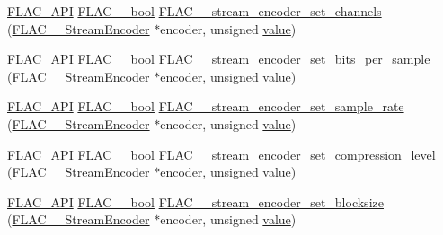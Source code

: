 \begin{DoxyCompactItemize}
\item 
\mbox{\hyperlink{group__flac__export_ga56ca07df8a23310707732b1c0007d6f5}{F\+L\+A\+C\+\_\+\+A\+PI}} \mbox{\hyperlink{ordinals_8h_a95103469f1cbd78b8cf250194985b34e}{F\+L\+A\+C\+\_\+\+\_\+bool}} \mbox{\hyperlink{group__flac__stream__encoder_gabfc9c883c124a849b5b42a87c30e10a5}{F\+L\+A\+C\+\_\+\+\_\+stream\+\_\+encoder\+\_\+set\+\_\+channels}} (\mbox{\hyperlink{struct_f_l_a_c_____stream_encoder}{F\+L\+A\+C\+\_\+\+\_\+\+Stream\+Encoder}} $\ast$encoder, unsigned \mbox{\hyperlink{_s_d_l__opengl__glext_8h_a8ad81492d410ff2ac11f754f4042150f}{value}})
\item 
\mbox{\hyperlink{group__flac__export_ga56ca07df8a23310707732b1c0007d6f5}{F\+L\+A\+C\+\_\+\+A\+PI}} \mbox{\hyperlink{ordinals_8h_a95103469f1cbd78b8cf250194985b34e}{F\+L\+A\+C\+\_\+\+\_\+bool}} \mbox{\hyperlink{group__flac__stream__encoder_ga5a21cf7f86a81df6ba72714a6b917aa3}{F\+L\+A\+C\+\_\+\+\_\+stream\+\_\+encoder\+\_\+set\+\_\+bits\+\_\+per\+\_\+sample}} (\mbox{\hyperlink{struct_f_l_a_c_____stream_encoder}{F\+L\+A\+C\+\_\+\+\_\+\+Stream\+Encoder}} $\ast$encoder, unsigned \mbox{\hyperlink{_s_d_l__opengl__glext_8h_a8ad81492d410ff2ac11f754f4042150f}{value}})
\item 
\mbox{\hyperlink{group__flac__export_ga56ca07df8a23310707732b1c0007d6f5}{F\+L\+A\+C\+\_\+\+A\+PI}} \mbox{\hyperlink{ordinals_8h_a95103469f1cbd78b8cf250194985b34e}{F\+L\+A\+C\+\_\+\+\_\+bool}} \mbox{\hyperlink{group__flac__stream__encoder_ga108c3f4fbdcaa744ddbb125f91cb3838}{F\+L\+A\+C\+\_\+\+\_\+stream\+\_\+encoder\+\_\+set\+\_\+sample\+\_\+rate}} (\mbox{\hyperlink{struct_f_l_a_c_____stream_encoder}{F\+L\+A\+C\+\_\+\+\_\+\+Stream\+Encoder}} $\ast$encoder, unsigned \mbox{\hyperlink{_s_d_l__opengl__glext_8h_a8ad81492d410ff2ac11f754f4042150f}{value}})
\item 
\mbox{\hyperlink{group__flac__export_ga56ca07df8a23310707732b1c0007d6f5}{F\+L\+A\+C\+\_\+\+A\+PI}} \mbox{\hyperlink{ordinals_8h_a95103469f1cbd78b8cf250194985b34e}{F\+L\+A\+C\+\_\+\+\_\+bool}} \mbox{\hyperlink{group__flac__stream__encoder_ga03495bcd0aae71116c701b0dcf311c4b}{F\+L\+A\+C\+\_\+\+\_\+stream\+\_\+encoder\+\_\+set\+\_\+compression\+\_\+level}} (\mbox{\hyperlink{struct_f_l_a_c_____stream_encoder}{F\+L\+A\+C\+\_\+\+\_\+\+Stream\+Encoder}} $\ast$encoder, unsigned \mbox{\hyperlink{_s_d_l__opengl__glext_8h_a8ad81492d410ff2ac11f754f4042150f}{value}})
\item 
\mbox{\hyperlink{group__flac__export_ga56ca07df8a23310707732b1c0007d6f5}{F\+L\+A\+C\+\_\+\+A\+PI}} \mbox{\hyperlink{ordinals_8h_a95103469f1cbd78b8cf250194985b34e}{F\+L\+A\+C\+\_\+\+\_\+bool}} \mbox{\hyperlink{group__flac__stream__encoder_gae6c001cd7601192334c58ee3631b571f}{F\+L\+A\+C\+\_\+\+\_\+stream\+\_\+encoder\+\_\+set\+\_\+blocksize}} (\mbox{\hyperlink{struct_f_l_a_c_____stream_encoder}{F\+L\+A\+C\+\_\+\+\_\+\+Stream\+Encoder}} $\ast$encoder, unsigned \mbox{\hyperlink{_s_d_l__opengl__glext_8h_a8ad81492d410ff2ac11f754f4042150f}{value}})

\end{DoxyCompactItemize}
